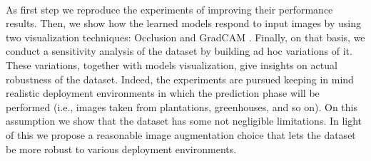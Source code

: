 \\\indent
As first step we reproduce the experiments of \cite{ref11} improving their performance results. Then, we show how the learned models respond to input images by using two visualization techniques: Occlusion \cite{ref13} and GradCAM \cite{ref12}. Finally, on that basis, we conduct a sensitivity analysis of the dataset by building ad hoc variations of it. These variations, together with models visualization, give insights on actual robustness of the dataset. Indeed, the experiments are pursued keeping in mind realistic deployment environments in which the prediction phase will be performed (i.e., images taken from plantations, greenhouses, and so on). On this assumption we show that the dataset has some not negligible limitations. In light of this we propose a reasonable image augmentation choice that lets the dataset be more robust to various deployment environments.